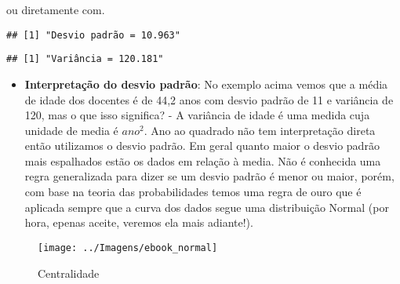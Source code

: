 \documentclass[12pt,]{style/krantz}
\makeatletter
\newenvironment{Shaded}{\begin{snugshade}}{\end{snugshade}}
\newcommand{\KeywordTok}[1]{\textcolor[rgb]{0.13,0.29,0.53}{\textbf{#1}}}
\newcommand{\DecValTok}[1]{\textcolor[rgb]{0.00,0.00,0.81}{#1}}
\newcommand{\StringTok}[1]{\textcolor[rgb]{0.31,0.60,0.02}{#1}}
\newcommand{\OperatorTok}[1]{\textcolor[rgb]{0.81,0.36,0.00}{\textbf{#1}}}
\newcommand{\NormalTok}[1]{#1}
\providecommand{\tightlist}{%
  \setlength{\itemsep}{0pt}\setlength{\parskip}{0pt}}
\newenvironment{kframe}{%
\medskip{}
\setlength{\fboxsep}{.8em}
 \def\at@end@of@kframe{}%
 \ifinner\ifhmode%
  \def\at@end@of@kframe{\end{minipage}}%
  \begin{minipage}{\columnwidth}%
 \fi\fi%
 \def\FrameCommand##1{\hskip\@totalleftmargin \hskip-\fboxsep
 \colorbox{shadecolor}{##1}\hskip-\fboxsep
     \hskip-\linewidth \hskip-\@totalleftmargin \hskip\columnwidth}%
 \MakeFramed {\advance\hsize-\width
   \@totalleftmargin\z@ \linewidth\hsize
   \@setminipage}}%
 {\par\unskip\endMakeFramed%
 \at@end@of@kframe}
\renewenvironment{Shaded}{\begin{kframe}}{\end{kframe}}
\theoremstyle{definition}
\theoremstyle{definition}
\theoremstyle{definition}
\theoremstyle{remark}
\makeatother
\begin{document}
ou diretamente com.

\begin{Shaded}
\end{Shaded}

\begin{verbatim}
## [1] "Desvio padrão = 10.963"
\end{verbatim}

\begin{Shaded}
\end{Shaded}

\begin{verbatim}
## [1] "Variância = 120.181"
\end{verbatim}

\begin{itemize}
\tightlist
\item
  \textbf{Interpretação do desvio padrão}: No exemplo acima vemos que a
  média de idade dos docentes é de 44,2 anos com desvio padrão de 11 e
  variância de 120, mas o que isso significa? - A variância de idade é
  uma medida cuja unidade de media é \(ano^2\). Ano ao quadrado não tem
  interpretação direta então utilizamos o desvio padrão. Em geral quanto
  maior o desvio padrão mais espalhados estão os dados em relação à
  media. Não é conhecida uma regra generalizada para dizer se um desvio
  padrão é menor ou maior, porém, com base na teoria das probabilidades
  temos uma regra de ouro que é aplicada sempre que a curva dos dados
  segue uma distribuição Normal (por hora, epenas aceite, veremos ela
  mais adiante!).
\end{itemize}

\begin{figure}[H]

{\centering \texttt{[image: ../Imagens/ebook\_normal]} 

}

\caption{Centralidade}\label{fig:fig09}
\end{figure}
\end{document}
